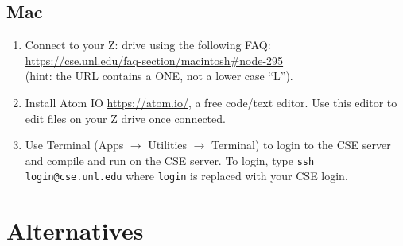 \documentclass[12pt]{scrartcl}
\begin{document}
\subsection{Mac}

\begin{enumerate}
  \item Connect to your Z: drive using the following FAQ: \\
  \url{https://cse.unl.edu/faq-section/macintosh#node-295}\\
  (hint: the URL contains a ONE, not a lower case ``L'').
  \item Install Atom IO \url{https://atom.io/}, a free code/text 
  editor.  Use this editor to edit files on your Z drive once connected.
  \item Use Terminal (Apps $\rightarrow$ Utilities $\rightarrow$ Terminal) to
  login to the CSE server and compile and run on the CSE server.  To login, type
  \texttt{ssh login@cse.unl.edu} where \texttt{login} 
  is replaced with your CSE login.
\end{enumerate}

%
%
%


\section*{Alternatives}
\end{document}
